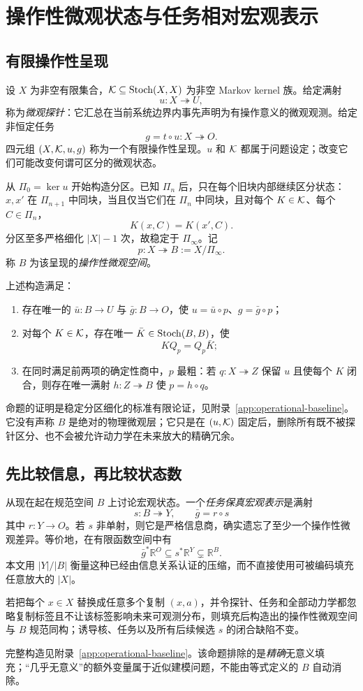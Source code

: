 \section{操作性微观状态与任务相对宏观表示}
\label{sec:operational}

\subsection{有限操作性呈现}

设 $X$ 为非空有限集合，$\mathcal K\subseteq\operatorname{Stoch}(X,X)$ 为非空 Markov kernel 族。给定满射
\[
u:X\twoheadrightarrow U,
\]
称为\emph{微观探针}：它汇总在当前系统边界内事先声明为有操作意义的微观观测。给定非恒定任务
\[
g=t\circ u:X\twoheadrightarrow O.
\]
四元组 $(X,\mathcal K,u,g)$ 称为一个有限操作性呈现。$u$ 和 $\mathcal K$ 都属于问题设定；改变它们可能改变何谓可区分的微观状态。

从 $\Pi_0=\ker u$ 开始构造分区。已知 $\Pi_n$ 后，只在每个旧块内部继续区分状态：$x,x'$ 在 $\Pi_{n+1}$ 中同块，当且仅当它们在 $\Pi_n$ 中同块，且对每个 $K\in\mathcal K$、每个 $C\in\Pi_n$，
\[
K(x,C)=K(x',C).
\]
分区至多严格细化 $|X|-1$ 次，故稳定于 $\Pi_\infty$。记
\[
p:X\twoheadrightarrow B:=X/\Pi_\infty.
\]
称 $B$ 为该呈现的\emph{操作性微观空间}。

\begin{proposition}[操作性微观基线]
\label{prop:operational-baseline}
上述构造满足：
\begin{enumerate}
  \item 存在唯一的 $\bar u:B\to U$ 与 $\bar g:B\to O$，使 $u=\bar u\circ p$、$g=\bar g\circ p$；
  \item 对每个 $K\in\mathcal K$，存在唯一 $\bar K\in\operatorname{Stoch}(B,B)$，使
  \[
  KQ_p=Q_p\bar K;
  \]
  \item 在同时满足前两项的确定性商中，$p$ 最粗：若 $q:X\twoheadrightarrow Z$ 保留 $u$ 且使每个 $K$ 闭合，则存在唯一满射 $h:Z\twoheadrightarrow B$ 使 $p=h\circ q$。
\end{enumerate}
\end{proposition}

命题的证明是稳定分区细化的标准有限论证，见附录~\ref{app:operational-baseline}。它没有声称 $B$ 是绝对的物理微观层；它只是在 $(u,\mathcal K)$ 固定后，删除所有既不被探针区分、也不会被允许动力学在未来放大的精确冗余。

\subsection{先比较信息，再比较状态数}

从现在起在规范空间 $B$ 上讨论宏观状态。一个\emph{任务保真宏观表示}是满射
\[
s:B\twoheadrightarrow Y,
\qquad
\bar g=r\circ s
\]
其中 $r:Y\to O$。若 $s$ 非单射，则它是严格信息商，确实遗忘了至少一个操作性微观差异。等价地，在有限函数空间中有
\[
\bar g^{*}\mathbb R^O
\subseteq
s^{*}\mathbb R^Y
\subsetneq
\mathbb R^B.
\]
本文用 $|Y|/|B|$ 衡量这种已经由信息关系认证的压缩，而不直接使用可被编码填充任意放大的 $|X|$。

\begin{proposition}[严格复制填充不变性]
\label{prop:padding}
若把每个 $x\in X$ 替换成任意多个复制 $(x,a)$，并令探针、任务和全部动力学都忽略复制标签且不让该标签影响未来可观测分布，则填充后构造出的操作性微观空间与 $B$ 规范同构；诱导核、任务以及所有后续候选 $s$ 的闭合缺陷不变。
\end{proposition}

完整构造见附录~\ref{app:operational-baseline}。该命题排除的是\emph{精确}无意义填充；“几乎无意义”的额外变量属于近似建模问题，不能由等式定义的 $B$ 自动消除。
